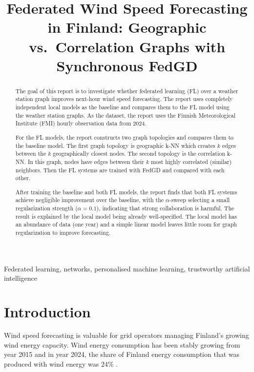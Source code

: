 \documentclass{article}
\title{Federated Wind Speed Forecasting in Finland: Geographic vs.\ Correlation Graphs with Synchronous FedGD}
\begin{document}
\maketitle

\begin{abstract}

	The goal of this report is to investigate whether federated learning (FL) over
	a weather station graph improves next-hour wind speed forecasting. The report
	uses completely independent local models as the baseline and compares them
	to the FL model using the weather station graphs. As the dataset, the report
	uses the Finnish Meteorological Institute (FMI) \cite{FMIOpenData} hourly
	observation data from 2024.

	For the FL models, the report constructs two graph topologies and compares
	them to the baseline model. The first graph topology is geographic k-NN which
	creates $k$ edges between the $k$ geographically closest nodes. The second
	topology is the correlation k-NN. In this graph, nodes have edges between their
	$k$ most highly correlated (similar) neighbors. Then the FL systems are trained
	with FedGD \cite{Jung2025} and compared with each other.

	After training the baseline and both FL models, the report finds that both FL
	systems achieve negligible improvement over the baseline, with the $\alpha$-sweep
	selecting a small regularization strength ($\alpha = 0.1$), indicating that
	strong collaboration is harmful. The result is explained by the local model being
	already well-specified. The local model has an abundance of data (one year) and
	a simple linear model leaves little room for graph regularization to improve
	forecasting.

\end{abstract}

\begin{keywords}
	Federated learning, networks, personalised machine learning, trustworthy artificial intelligence
\end{keywords}

\section{Introduction}

Wind speed forecasting is valuable for grid operators managing Finland's growing
wind energy capacity. Wind energy consumption has been stably growing from year 2015
and in year 2024, the share of Finland energy consumption that was produced with wind
energy was 24\% \cite{StatisticsFinland2025}.
\end{document}
